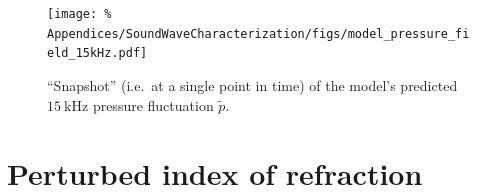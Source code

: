 \begin{figure}
  \centering
  \texttt{[image: \%
    Appendices/SoundWaveCharacterization/figs/model\_pressure\_field\_15kHz.pdf]}
  \caption[Snapshot of modeled pressure fluctuation]{%
    ``Snapshot'' (i.e.\ at a single point in time) of the model's predicted
    $\SI{15}{\kilo\hertz}$ pressure fluctuation $\widetilde{p}$.
  }
\label{fig:SoundWaveCharacterization:model_pressure_field_15kHz}
\end{figure}


\section{Perturbed index of refraction}
\label{sec:SoundWaveCharacterization:PerturbedIndexOfRefractiion}




